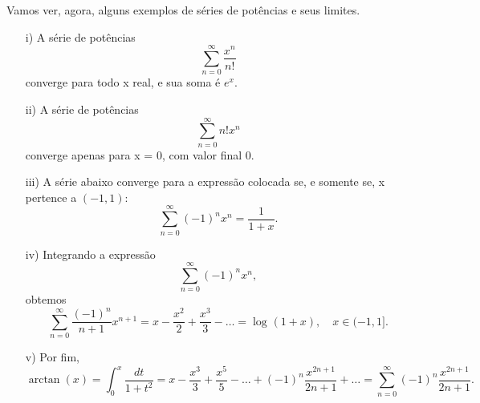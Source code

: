 \documentclass[../analysis_notes.tex]{subfiles}
\begin{document}
Vamos ver, agora, alguns exemplos de séries de potências e seus limites.
\begin{example}
	\begin{itemize}
		\item[i)] A série de potências
		      \[
			      \sum\limits_{n=0}^{\infty}\frac{x^{n}}{n!}
		      \]
		      converge para todo x real, e sua soma é \(e^{x}\).
		\item[ii)] A série de potências
		      \[
			      \sum\limits_{n=0}^{\infty}n!x^{n}
		      \]
		      converge apenas para x = 0, com valor final 0.
		\item[iii)] A série abaixo converge para a expressão colocada se, e somente se, x pertence a \((-1, 1)\):
		      \[
			      \sum\limits_{n=0}^{\infty}(-1)^{n}x^{n} = \frac{1}{1+x}.
		      \]
		\item[iv)] Integrando a expressão
		      \[
			      \sum\limits_{n=0}^{\infty} (-1)^{n}x^{n},
		      \]
		      obtemos
		      \[
			      \sum\limits_{n=0}^{\infty}\frac{(-1)^{n}}{n+1}x^{n+1}=x-\frac{x^{2}}{2}+\frac{x^{3}}{3}-\dotsc =\log^{}{(1+x)},\quad x\in (-1, 1].
		      \]
		\item[v)] Por fim,
		      \[
			      \arctan(x)=\int_{0}^{x}\frac{dt}{1+t^{2}}=x-\frac{x^{3}}{3}+\frac{x^{5}}{5}-\dotsc +(-1)^{n}\frac{x^{2n+1}}{2n+1}+\dotsc =\sum\limits_{n=0}^{\infty}(-1)^{n}\frac{x^{2n+1}}{2n+1}.
		      \]
	\end{itemize}
\end{example}
\end{document}
